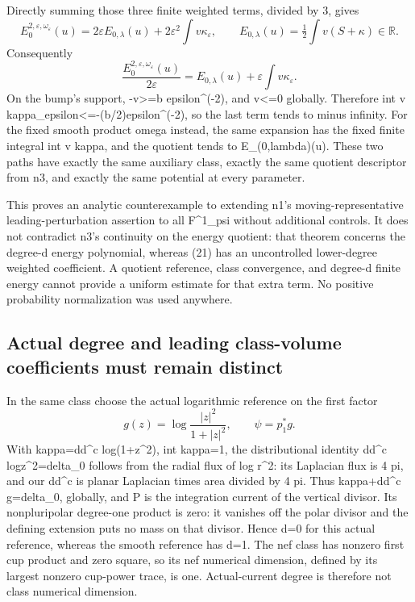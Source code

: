 \documentclass[
]{article}
\begin{document}
Directly summing those three finite weighted terms, divided by 3, gives
\[
E^{2,\varepsilon,\omega_\varepsilon}_0(u)
=2\varepsilon E_{0,\lambda}(u)+2\varepsilon^2\int v\kappa_\varepsilon,
\qquad E_{0,\lambda}(u)=\tfrac12\int v(S+\kappa)\in\mathbb{R}.
\] Consequently \[
\frac{E^{2,\varepsilon,\omega_\varepsilon}_0(u)}{2\varepsilon}
=E_{0,\lambda}(u)+\varepsilon\int v\kappa_\varepsilon.\tag{21}
\] On the bump's support, -v\textgreater=b epsilon\^{}(-2), and
v\textless=0 globally. Therefore int v
kappa\_epsilon\textless=-(b/2)epsilon\^{}(-2), so the last term tends to
minus infinity. For the fixed smooth product omega instead, the same
expansion has the fixed finite integral int v kappa, and the quotient
tends to E\_(0,lambda)(u). These two paths have exactly the same
auxiliary class, exactly the same quotient descriptor from n3, and
exactly the same potential at every parameter.

This proves an analytic counterexample to extending n1's
moving-representative leading-perturbation assertion to all F\^{}1\_psi
without additional controls. It does not contradict n3's continuity on
the energy quotient: that theorem concerns the degree-d energy
polynomial, whereas (21) has an uncontrolled lower-degree weighted
coefficient. A quotient reference, class convergence, and degree-d
finite energy cannot provide a uniform estimate for that extra term. No
positive probability normalization was used anywhere.

\subsection{Actual degree and leading class-volume coefficients must
remain
distinct}\label{actual-degree-and-leading-class-volume-coefficients-must-remain-distinct}

In the same class choose the actual logarithmic reference on the first
factor \[
g(z)=\log\frac{|z|^2}{1+|z|^2},\qquad\psi=p_1^*g.
\] With kappa=dd\^{}c log(1+\textbar z\textbar\^{}2), int kappa=1, the
distributional identity dd\^{}c log\textbar z\textbar\^{}2=delta\_0
follows from the radial flux of log r\^{}2: its Laplacian flux is 4 pi,
and our dd\^{}c is planar Laplacian times area divided by 4 pi. Thus
kappa+dd\^{}c g=delta\_0, globally, and P is the integration current of
the vertical divisor. Its nonpluripolar degree-one product is zero: it
vanishes off the polar divisor and the defining extension puts no mass
on that divisor. Hence d=0 for this actual reference, whereas the smooth
reference has d=1. The nef class has nonzero first cup product and zero
square, so its nef numerical dimension, defined by its largest nonzero
cup-power trace, is one. Actual-current degree is therefore not class
numerical dimension.
\end{document}
